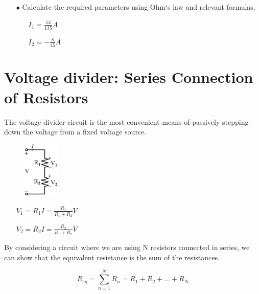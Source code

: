 \documentclass[a4 paper]{article}
\numberwithin{equation}{section}
\newcommand{\0}{\mathbf{0}}
\begin{document}
\begin{itemize}
\begin{enumerate}
  \end{enumerate}
  \item[$\bullet$] Calculate the required parameters using Ohm`s law and relevant formulas.
  \begin{enumerate} \itemsep1pt \parskip0pt 
    \item[] \centerline{$I_1 = \frac{14}{135}A$}
    \item[] \centerline{$I_2 = -\frac{8}{45}A$}
  \end{enumerate}

\end{itemize}








\section{Voltage divider: Series Connection of Resistors}
The voltage divider circuit is the most convenient means of passively stepping down the voltage from a fixed voltage source. 


\begin{figure}[ht!]
  \centering
  \includegraphics[width=0.15\textwidth]{./images/circuit1/append_end2}
\end{figure}


\begin{itemize} \itemsep1pt \parskip0pt  
  \item[] 
  \item[] \hspace{6.6 cm}$V_1 = R_1I = \frac{R_1}{R_1 + R_2}V$
  \item[] \hspace{6.6 cm}$V_2 = R_2I = \frac{R_2}{R_1 + R_2}V$
\end{itemize}

By considering a circuit where we are using N resistors connected in series, we can show that the equivalent resistance is the sum of the resistances.

\begin{equation}
R_{eq} = \sum_{n=1}^{N}R_n=R_1+R_2+...+R_N
\end{equation}
\end{document}
